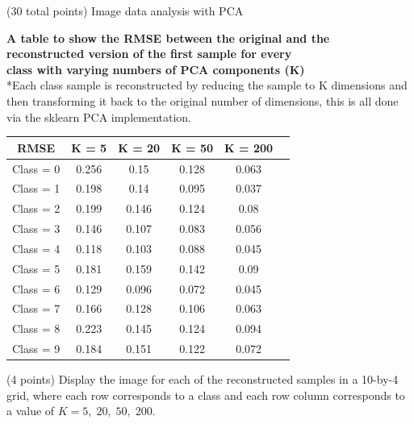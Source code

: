 \documentclass[12pt]{article}
\begin{document}
\begin{question}{(30 total points) Image data analysis with PCA}
\begin{subquestion}
      \begin{answerbox}{28em}
        \begin{center}
        \large{\textbf{A table to show the RMSE between the original and the}}\\
        \large{\textbf{reconstructed version of the first sample for every}}\\
        \large{\textbf{class with varying numbers of PCA components (K)}} \\
        \vspace{0.3cm}
        \normalsize{*Each class sample is reconstructed by reducing the sample to K dimensions and then transforming it back to the original number of dimensions, this is all done via the sklearn PCA implementation.}\\
        \vspace{0.5cm}
        \begin{tabular}{ |c|c|c|c|c|c| } \hline
            \textbf{RMSE} & K = 5 & K = 20 & K = 50 & K = 200 \\ \hline
            Class = 0 & 0.256 & 0.15 & 0.128 & 0.063 \\
            Class = 1 & 0.198 & 0.14 & 0.095 & 0.037 \\
            Class = 2 & 0.199 & 0.146 & 0.124 & 0.08 \\
            Class = 3 & 0.146 & 0.107 & 0.083 & 0.056 \\
            Class = 4 & 0.118 & 0.103 & 0.088 & 0.045 \\
            Class = 5 & 0.181 & 0.159 & 0.142 & 0.09 \\
            Class = 6 & 0.129 & 0.096 & 0.072 & 0.045 \\
            Class = 7 & 0.166 & 0.128 & 0.106 & 0.063 \\
            Class = 8 & 0.223 & 0.145 & 0.124 & 0.094 \\
            Class = 9 & 0.184 & 0.151 & 0.122 & 0.072 \\
            \hline
        \end{tabular}
        \end{center}
      \end{answerbox}
  


   \end{subquestion}
   
   \begin{subquestion}{(4 points)
       Display the image for each of the reconstructed samples in
       a 10-by-4 grid, where each row corresponds to a class and
       each row column corresponds to a value of $K=5, \; 20, \; 50, \; 200$.
     } \label{Q1.7}



\end{subquestion}
\end{question}
\end{document}

